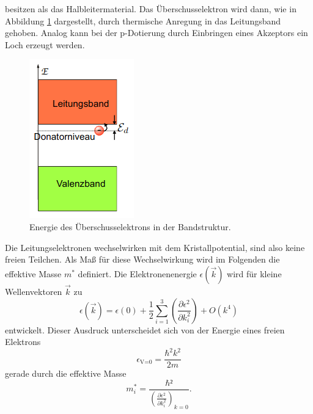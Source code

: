 besitzen als das Halbleitermaterial. Das Überschusselektron wird dann, wie in Abbildung \ref{fig:Donatorenergie} dargestellt, durch thermische Anregung in das
Leitungsband gehoben. Analog kann bei der p-Dotierung durch Einbringen eines Akzeptors ein Loch erzeugt werden. 
\begin{figure}[H]
    \centering
    \includegraphics[scale=0.8]{pictures/Donatorelektron.png}
    \caption{Energie des Überschusselektrons in der Bandstruktur. \cite{Halbleiter}}
    \label{fig:Donatorenergie}
\end{figure}
\noindent
Die Leitungselektronen wechselwirken mit dem Kristallpotential, sind also keine freien Teilchen. Als Maß für diese Wechselwirkung wird im Folgenden die 
effektive Masse $m^*$ definiert. Die Elektronenenergie $\epsilon(\vec{k})$ wird für kleine Wellenvektoren $\vec{k}$ zu
\begin{equation}
    \epsilon(\vec{k})=\epsilon(0)+\frac{1}{2}\sum_{i=1}^3\left(\frac{\partial \epsilon^2}{\partial k_i^2}\right)+O(k^4) 
    \label{eqn:Taylor}
\end{equation}
entwickelt. Dieser Ausdruck unterscheidet sich von der Energie eines freien Elektrons
\begin{equation*}
    \epsilon_\text{V=0}=\frac{\hbar^2 k^2}{2m}
\end{equation*}
gerade durch die effektive Masse
\begin{equation*}
    m_i^*=\frac{\hbar²}{\left(\frac{\partial \epsilon^2}{\partial k_i^2}\right)_{k=0}} .
\end{equation*}

